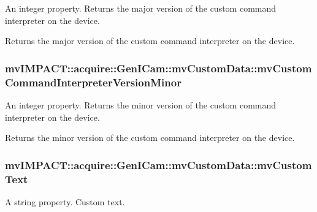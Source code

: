 An integer property. Returns the major version of the custom command interpreter on the device. 

Returns the major version of the custom command interpreter on the device. \hypertarget{classmv_i_m_p_a_c_t_1_1acquire_1_1_gen_i_cam_1_1mv_custom_data_ad355488a2d26cd855940418a24a2b790}{
\subsubsection[{mv\+Custom\+Command\+Interpreter\+Version\+Minor}]{ mv\+I\+M\+P\+A\+C\+T\+::acquire\+::\+Gen\+I\+Cam\+::mv\+Custom\+Data\+::mv\+Custom\+Command\+Interpreter\+Version\+Minor}}\label{classmv_i_m_p_a_c_t_1_1acquire_1_1_gen_i_cam_1_1mv_custom_data_ad355488a2d26cd855940418a24a2b790}


An integer property. Returns the minor version of the custom command interpreter on the device. 

Returns the minor version of the custom command interpreter on the device. \hypertarget{classmv_i_m_p_a_c_t_1_1acquire_1_1_gen_i_cam_1_1mv_custom_data_ae8420def2ef3798241e6b6a2c0cecd6a}{
\subsubsection[{mv\+Custom\+Text}]{ mv\+I\+M\+P\+A\+C\+T\+::acquire\+::\+Gen\+I\+Cam\+::mv\+Custom\+Data\+::mv\+Custom\+Text}}\label{classmv_i_m_p_a_c_t_1_1acquire_1_1_gen_i_cam_1_1mv_custom_data_ae8420def2ef3798241e6b6a2c0cecd6a}


A string property. Custom text. 

